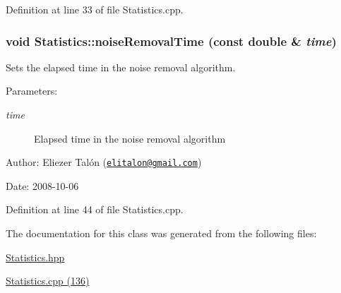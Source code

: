 Definition at line 33 of file Statistics.cpp.\hypertarget{class_statistics_4ad24aec4e5491b7d3afca143e6deb05}{
\subsubsection[noiseRemovalTime]{\setlength{\rightskip}{0pt plus 5cm}void Statistics::noiseRemovalTime (const double \& {\em time})}}
\label{class_statistics_4ad24aec4e5491b7d3afca143e6deb05}


Sets the elapsed time in the noise removal algorithm. 

\begin{Desc}
\item[Parameters:]
\begin{description}
\item[{\em time}]Elapsed time in the noise removal algorithm\end{description}
\end{Desc}
\begin{Desc}
\item[Author:]Eliezer Talón (\href{mailto:elitalon@gmail.com}{\tt elitalon@gmail.com}) \end{Desc}
\begin{Desc}
\item[Date:]2008-10-06 \end{Desc}


Definition at line 44 of file Statistics.cpp.

The documentation for this class was generated from the following files:\begin{CompactItemize}
\item 
\hyperlink{_statistics_8hpp}{Statistics.hpp}\item 
\hyperlink{_statistics_8cpp}{Statistics.cpp (136)}\end{CompactItemize}
